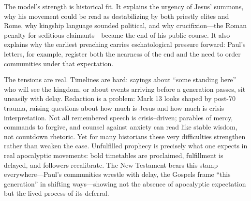 The model’s strength is historical fit.
It explains the urgency of Jesus’ summons, why his movement could be read as destabilizing by both priestly elites and Rome, why kingship language sounded political, and why crucifixion—the Roman penalty for seditious claimants—became the end of his public course.
It also explains why the earliest preaching carries eschatological pressure forward: Paul’s letters, for example, register both the nearness of the end and the need to order communities under that expectation.

The tensions are real.
Timelines are hard: sayings about “some standing here” who will see the kingdom, or about events arriving before a generation passes, sit uneasily with delay.
Redaction is a problem: Mark 13 looks shaped by post-70 trauma, raising questions about how much is Jesus and how much is crisis interpretation.
Not all remembered speech is crisis–driven; parables of mercy, commands to forgive, and counsel against anxiety can read like stable wisdom, not countdown rhetoric.
Yet for many historians these very difficulties strengthen rather than weaken the case.
Unfulfilled prophecy is precisely what one expects in real apocalyptic movements: bold timetables are proclaimed, fulfillment is delayed, and followers recalibrate.
The New Testament bears this stamp everywhere—Paul’s communities wrestle with delay, the Gospels frame “this generation” in shifting ways—showing not the absence of apocalyptic expectation but the lived process of its deferral.


